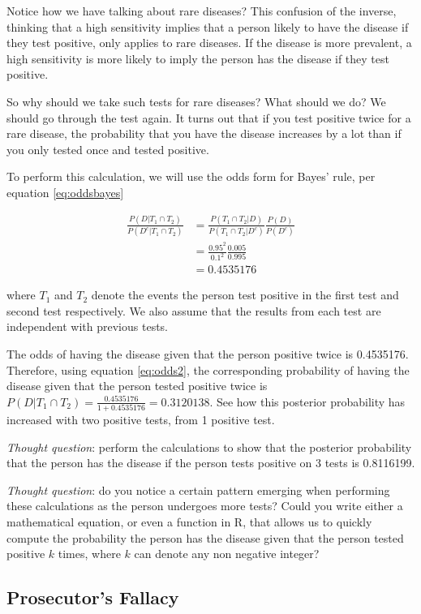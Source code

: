 \documentclass[
]{book}
\begin{document}
Notice how we have talking about rare diseases? This confusion of the inverse, thinking that a high sensitivity implies that a person likely to have the disease if they test positive, only applies to rare diseases. If the disease is more prevalent, a high sensitivity is more likely to imply the person has the disease if they test positive.

So why should we take such tests for rare diseases? What should we do? We should go through the test again. It turns out that if you test positive twice for a rare disease, the probability that you have the disease increases by a lot than if you only tested once and tested positive.

To perform this calculation, we will use the odds form for Bayes' rule, per equation \eqref{eq:oddsbayes}

\[
\begin{split}
\frac{P(D|T_1 \cap T_2)}{P(D^c|T_1 \cap T_2)} &= \frac{P(T_1 \cap T_2 | D)}{P(T_1 \cap T_2 | D^c)} \frac{P(D)}{P(D^c)}\\
 &= \frac{0.95^2}{0.1^2} \frac{0.005}{0.995} \\
&= 0.4535176
\end{split}
\]

where \(T_1\) and \(T_2\) denote the events the person test positive in the first test and second test respectively. We also assume that the results from each test are independent with previous tests.

The odds of having the disease given that the person positive twice is 0.4535176. Therefore, using equation \eqref{eq:odds2}, the corresponding probability of having the disease given that the person tested positive twice is \(P(D|T_1 \cap T_2) = \frac{0.4535176}{1+0.4535176} = 0.3120138\). See how this posterior probability has increased with two positive tests, from 1 positive test.

\emph{Thought question}: perform the calculations to show that the posterior probability that the person has the disease if the person tests positive on 3 tests is 0.8116199.

\emph{Thought question}: do you notice a certain pattern emerging when performing these calculations as the person undergoes more tests? Could you write either a mathematical equation, or even a function in R, that allows us to quickly compute the probability the person has the disease given that the person tested positive \(k\) times, where \(k\) can denote any non negative integer?

\subsection{Prosecutor's Fallacy}\label{prosecutors-fallacy}
\end{document}
